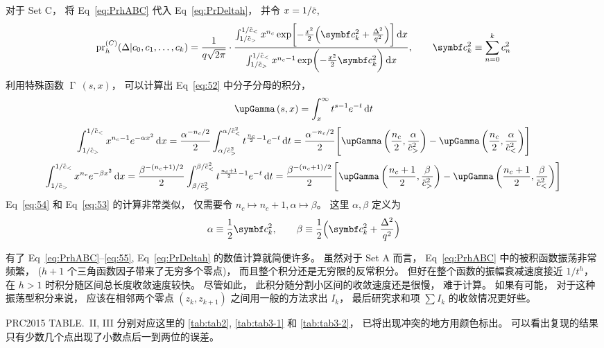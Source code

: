 对于 Set C，
将 Eq~\eqref{eq:PrhABC} 代入 Eq~\eqref{eq:PrDeltah}，
并令 $x=1/\dmscbar$,
\begin{equation}
  \label{eq:52}
  \dmspr_h^{(C)}(\Delta|\dmsccck) = \frac{1}{q\sqrt{2\pi}}\cdot\frac{
    \int_{1/\dmscbar_>}^{1/\dmscbar_<}x^{n_c}\exp\biggl[- \frac{x^2}{2}\Bigl(
    \dmsccckb^2+\frac{\Delta^2}{q^2}\Bigr)\biggr]\dmsdif x}{
    \int_{1/\dmscbar_>}^{1/\dmscbar_<}x^{n_c-1}\exp\biggl(- \frac{
      x^2}{2}\dmsccckb^2\biggr)\dmsdif x},
  \qquad \dmsccckb^2\equiv\sum_{n=0}^k c_n^2
\end{equation}
利用特殊函数 $\upGamma\,(s,x)$，
可以计算出 Eq~\eqref{eq:52} 中分子分母的积分，
\begin{equation}
  \label{eq:upGammasx}
  \upGamma\,(s,x) = \int_x^\infty t^{s-1}e^{-t}\dmsdif t
\end{equation}
\begin{equation}
  \label{eq:53}
  \int_{1/\dmscbar_>}^{1/\dmscbar_<}x^{n_c-1}e^{-\alpha x^2}\dmsdif x
  = \frac{\alpha^{-n_c/2}}{2}
  \int_{\alpha/\dmscbar_>^2}^{\alpha/\dmscbar_<^2}
    t^{ \frac{n_c}{2}-1}e^{-t}\dmsdif t
  = \frac{\alpha^{-n_c/2}}{2}
  \Biggl[\upGamma\,\biggl( \frac{n_c}{2},
    \frac{\alpha}{\dmscbar_>^2}\biggr)
      - \upGamma\,\biggl( \frac{n_c}{2},
      \frac{\alpha}{\dmscbar_<^2}\biggr)\Biggr]
\end{equation}
\begin{equation}
  \label{eq:54}
  \int_{1/\dmscbar_>}^{1/\dmscbar_<}x^{n_c}e^{-\beta x^2}\dmsdif x
  = \frac{\beta^{-(n_c+1)/2}}{2}
  \int_{\beta/\dmscbar_>^2}^{\beta/\dmscbar_<^2}
    t^{ \frac{n_c+1}{2}-1}e^{-t}\dmsdif t
  = \frac{\beta^{-(n_c+1)/2}}{2}
  \Biggl[\upGamma\,\biggl( \frac{n_c+1}{2},
    \frac{\beta}{\dmscbar_>^2}\biggr)
      - \upGamma\,\biggl( \frac{n_c+1}{2},
      \frac{\beta}{\dmscbar_<^2}\biggr)\Biggr]
\end{equation}
Eq~\eqref{eq:54} 和 Eq~\eqref{eq:53} 的计算非常类似，
仅需要令 $n_c\mapsto n_c+1, \alpha\mapsto\beta$。
这里 $\alpha,\beta$ 定义为
\begin{equation}
  \label{eq:55}
  \alpha\equiv \frac{1}{2}\dmsccckb^2,
  \qquad
  \beta\equiv \frac{1}{2}\Bigl(\dmsccckb^2+ \frac{\Delta^2}{q^2}
  \Bigr)
\end{equation}

有了 Eq~\eqref{eq:PrhABC}--\eqref{eq:55},
Eq~\eqref{eq:PrDeltah} 的数值计算就简便许多。
虽然对于 Set A 而言，
Eq~\eqref{eq:PrhABC} 中的被积函数振荡非常频繁，
($h+1$ 个三角函数因子带来了无穷多个零点)，
而且整个积分还是无穷限的反常积分。
但好在整个函数的振幅衰减速度接近 $1/t^h$，
在 $h>1$ 时积分随区间总长度收敛速度较快。
尽管如此，
此积分随分割小区间的收敛速度还是很慢，
难于计算。
如果有可能，
对于这种振荡型积分来说，
应该在相邻两个零点 $(z_k,z_{k+1})$ 之间用一般的方法求出 $I_k$，
最后研究求和项 $\sum I_k$ 的收敛情况更好些。

PRC2015 TABLE.~II, III 分别对应这里的
\autoref{tab:tab2}, \autoref{tab:tab3-1} 和 \autoref{tab:tab3-2}，
已将出现冲突的地方用颜色标出。
可以看出复现的结果只有少数几个点出现了小数点后一到两位的误差。
